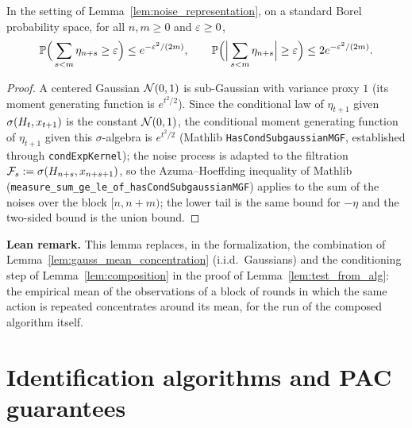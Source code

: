 \begin{lemma}\label{lem:noise_azuma}
\leanok
{}
In the setting of Lemma~\ref{lem:noise_representation}, on a standard Borel probability space,
for all $n, m \ge 0$ and $\varepsilon \ge 0$,
\[
  \mathbb{P}\Big(\sum_{s<m}\eta_{n+s} \ge \varepsilon\Big) \le e^{-\varepsilon^2/(2m)},
  \qquad
  \mathbb{P}\Big(\Big|\sum_{s<m}\eta_{n+s}\Big| \ge \varepsilon\Big) \le 2e^{-\varepsilon^2/(2m)} .
\]
\end{lemma}

\begin{proof}
\leanok
{}
A centered Gaussian $\mathcal{N}(0,1)$ is sub-Gaussian with variance proxy $1$
(its moment generating function is $e^{t^2/2}$). Since the conditional law of $\eta_{t+1}$ given
$\sigma(H_t, x_{t+1})$ is the constant $\mathcal{N}(0,1)$, the conditional moment generating
function of $\eta_{t+1}$ given this $\sigma$-algebra is $e^{t^2/2}$ (Mathlib
\texttt{HasCondSubgaussianMGF}, established through \texttt{condExpKernel}); the noise
process is adapted to the filtration $\mathcal F_s := \sigma(H_{n+s}, x_{n+s+1})$, so the
Azuma--Hoeffding inequality of Mathlib
(\texttt{measure\_sum\_ge\_le\_of\_hasCondSubgaussianMGF}) applies to the sum of the noises
over the block $[n, n+m)$; the lower tail is the same bound for $-\eta$ and the two-sided bound
is the union bound.
\end{proof}

\textbf{Lean remark.} This lemma replaces, in the formalization, the combination of
Lemma~\ref{lem:gauss_mean_concentration} (i.i.d.\ Gaussians) and the conditioning step of
Lemma~\ref{lem:composition} in the proof of Lemma~\ref{lem:test_from_alg}: the empirical mean of
the observations of a block of rounds in which the same action is repeated concentrates around
its mean, for the run of the composed algorithm itself.

\section{Identification algorithms and PAC guarantees}
\label{sec:model_pac}

